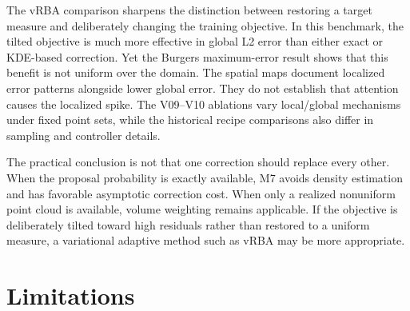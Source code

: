 \documentclass[
  11pt,
]{article}
\begin{document}
The vRBA comparison sharpens the distinction between restoring a target
measure and deliberately changing the training objective. In this
benchmark, the tilted objective is much more effective in global L2
error than either exact or KDE-based correction. Yet the Burgers
maximum-error result shows that this benefit is not uniform over the
domain. The spatial maps document localized error patterns alongside
lower global error. They do not establish that attention causes the
localized spike. The V09--V10 ablations vary local/global mechanisms
under fixed point sets, while the historical recipe comparisons also
differ in sampling and controller details.

The practical conclusion is not that one correction should replace every
other. When the proposal probability is exactly available, M7 avoids
density estimation and has favorable asymptotic correction cost. When
only a realized nonuniform point cloud is available, volume weighting
remains applicable. If the objective is deliberately tilted toward high
residuals rather than restored to a uniform measure, a variational
adaptive method such as vRBA may be more appropriate.

\hypertarget{limitations}{%
\section{Limitations}\label{limitations}}
\end{document}
